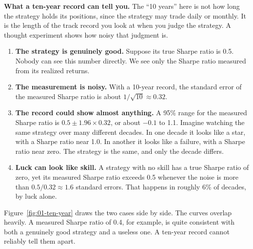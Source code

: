 \textbf{What a ten-year record can tell you.} The ``10 years'' here is not how long the strategy holds its positions, since the strategy may trade daily or monthly. It is the length of the track record you look at when you judge the strategy. A thought experiment shows how noisy that judgment is.

\begin{enumerate}
  \item \textbf{The strategy is genuinely good.} Suppose its true Sharpe ratio is 0.5. Nobody can see this number directly. We see only the Sharpe ratio measured from its realized returns.
  \item \textbf{The measurement is noisy.} With a 10-year record, the standard error of the measured Sharpe ratio is about $1/\sqrt{10} \approx 0.32$.
  \item \textbf{The record could show almost anything.} A 95\% range for the measured Sharpe ratio is $0.5 \pm 1.96 \times 0.32$, or about $-0.1$ to 1.1. Imagine watching the same strategy over many different decades. In one decade it looks like a star, with a Sharpe ratio near 1.0. In another it looks like a failure, with a Sharpe ratio near zero. The strategy is the same, and only the decade differs.
  \item \textbf{Luck can look like skill.} A strategy with no skill has a true Sharpe ratio of zero, yet its measured Sharpe ratio exceeds 0.5 whenever the noise is more than $0.5/0.32 \approx 1.6$ standard errors. That happens in roughly 6\% of decades, by luck alone.
\end{enumerate}

Figure~\ref{fig:01-ten-year} draws the two cases side by side. The curves overlap heavily. A measured Sharpe ratio of 0.4, for example, is quite consistent with both a genuinely good strategy and a useless one. A ten-year record cannot reliably tell them apart.


